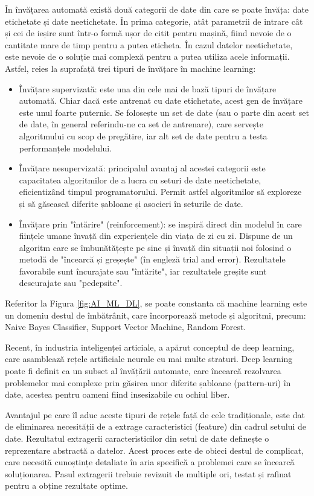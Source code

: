\documentclass[a4paper, 12pt]{report}
\begin{document}
	În învățarea automată există două categorii de date din care se poate învăța: date etichetate și date neetichetate. În prima categorie, atât parametrii de intrare cât și cei de ieșire sunt într-o formă ușor de citit pentru mașină, fiind nevoie de o cantitate mare de timp pentru a putea eticheta. În cazul datelor neetichetate, este nevoie de o soluție mai complexă pentru a putea utiliza acele informații. Astfel, reies la suprafață trei tipuri de învățare în machine learning:
	\begin{itemize}
		\item Învățare supervizată: este una din cele mai de bază tipuri de învățare automată. Chiar dacă este antrenat cu date etichetate, acest gen de învățare este unul foarte puternic. Se folosește un set de date (sau o parte din acest set de date, în general referindu-ne ca set de antrenare), care servește algoritmului cu scop de pregătire, iar alt set de date pentru a testa performanțele modelului.
		\item Învățare nesupervizată: principalul avantaj al acestei categorii este capacitatea algoritmilor de a lucra cu seturi de date neetichetate, eficientizând timpul programatorului. Permit astfel algoritmilor să exploreze și să găsească diferite șabloane și asocieri în seturile de date.
		\item Învățare prin "întărire" (reinforcement): se inspiră direct din modelul în care ființele umane învață din experiențele din viața de zi cu zi. Dispune de un algoritm care se îmbunătățește pe sine și învață din situații noi folosind o metodă de "încearcă și greșește" (în engleză trial and error). Rezultatele favorabile sunt încurajate sau "întărite", iar rezultatele greșite sunt descurajate sau "pedepsite".
	\end{itemize}
	
	Referitor la Figura \ref{fig:AI_ML_DL}, se poate constanta că machine learning este un domeniu destul de îmbătrânit, care încorporează metode și algoritmi, precum: Naive Bayes Classifier, Support Vector Machine, Random Forest. 

	Recent, în industria inteligenței articiale, a apărut conceptul de deep learning, care asamblează rețele artificiale neurale cu mai multe straturi. Deep learning poate fi definit ca un subset al învățării automate, care încearcă rezolvarea problemelor mai complexe prin găsirea unor diferite șabloane (pattern-uri) în date, acestea pentru oameni fiind insesizabile cu ochiul liber.

	Avantajul pe care îl aduc aceste tipuri de rețele față de cele tradiționale, este dat de eliminarea necesității de a extrage caracteristici (feature) din cadrul setului de date. Rezultatul extragerii caracteristicilor din setul de date definește o reprezentare abstractă a datelor. Acest proces este de obieci destul de complicat, care necesită cunoștințe detaliate în aria specifică a problemei care se încearcă soluționarea. Pasul extragerii trebuie revizuit de multiple ori, testat și rafinat pentru a obține rezultate optime.
	
\end{document}
